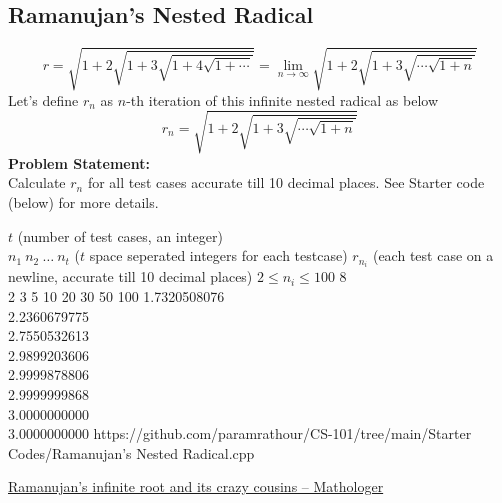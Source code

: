 \subsection{Ramanujan's Nested Radical}{\label{pp:ramanujanradical}}
\begin{equation}
{ r={\sqrt{1+2{\sqrt{1+3{\sqrt{1+4{\sqrt{1+\cdots }} }}}}}} = \lim_{n\rightarrow\infty} {\sqrt {1+2{\sqrt {1+3{\sqrt {\cdots \sqrt{1+ n}}}}}}}}
\end{equation}
Let's define $r_n$ as $n$-th iteration of this infinite nested radical as below
\begin{equation*}
{ r_n={\sqrt {1+2{\sqrt {1+3{\sqrt {\cdots \sqrt{1+ n}}}}}}}}
\end{equation*}
\textbf{Problem Statement:}\\
Calculate $r_n$ for all test cases accurate till 10 decimal places. See Starter code (below) for more details.
\begin{testcases}
	{$t$ \hfill(number of test cases, an integer)\\$n_1\ n_2\ \ldots\ n_t$ \hfill($t$ space seperated integers for each testcase)}
	{$r_{n_i}$ \hfill(each test case on a newline, accurate till 10 decimal places)}
	{$2 \leq n_i \leq 100$}
	{8\\2 3 5 10 20 30 50 100}
	{1.7320508076\\2.2360679775\\2.7550532613\\2.9899203606\\2.9999878806\\2.9999999868\\3.0000000000\\3.0000000000}
	{https://github.com/paramrathour/CS-101/tree/main/Starter Codes/Ramanujan's Nested Radical.cpp}
\end{testcases}
\begin{funvideo}
\href{https://youtu.be/leFep9yt3JY}{Ramanujan's infinite root and its crazy cousins -- Mathologer}
\end{funvideo}
